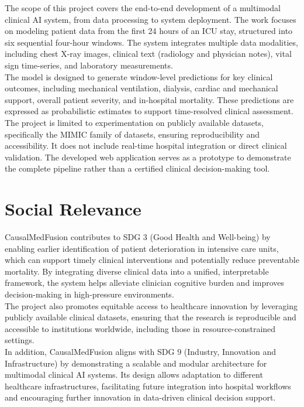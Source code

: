 \documentclass{fisatprojectfinal}
\begin{document}
The scope of this project covers the end-to-end development of a multimodal clinical AI system, from data processing to system deployment. The work focuses on modeling patient data from the first 24 hours of an ICU stay, structured into six sequential four-hour windows. The system integrates multiple data modalities, including chest X-ray images, clinical text (radiology and physician notes), vital sign time-series, and laboratory measurements. \\ 

The model is designed to generate window-level predictions for key clinical outcomes, including mechanical ventilation, dialysis, cardiac and mechanical support, overall patient severity, and in-hospital mortality. These predictions are expressed as probabilistic estimates to support time-resolved clinical assessment. \\

The project is limited to experimentation on publicly available datasets, specifically the MIMIC family of datasets, ensuring reproducibility and accessibility. It does not include real-time hospital integration or direct clinical validation. The developed web application serves as a prototype to demonstrate the complete pipeline rather than a certified clinical decision-making tool. 

\section{Social Relevance}

CausalMedFusion contributes to SDG 3 (Good Health and Well-being) by enabling earlier identification of patient deterioration in intensive care units, which can support timely clinical interventions and potentially reduce preventable mortality. By integrating diverse clinical data into a unified, interpretable framework, the system helps alleviate clinician cognitive burden and improves decision-making in high-pressure environments.\\

The project also promotes equitable access to healthcare innovation by leveraging publicly available clinical datasets, ensuring that the research is reproducible and accessible to institutions worldwide, including those in resource-constrained settings.\\

In addition, CausalMedFusion aligns with SDG 9 (Industry, Innovation and Infrastructure) by demonstrating a scalable and modular architecture for multimodal clinical AI systems. Its design allows adaptation to different healthcare infrastructures, facilitating future integration into hospital workflows and encouraging further innovation in data-driven clinical decision support. 
\end{document}
